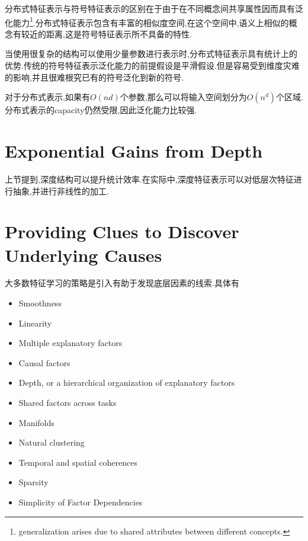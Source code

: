 分布式特征表示与符号特征表示的区别在于由于在不同概念间共享属性因而具有泛化能力\footnote{generalization arises due to shared attributes between different concepts.}.分布式特征表示包含有丰富的相似度空间,在这个空间中,语义上相似的概念有较近的距离,这是符号特征表示所不具备的特性.

当使用很复杂的结构可以使用少量参数进行表示时,分布式特征表示具有统计上的优势.传统的符号特征表示泛化能力的前提假设是平滑假设.但是容易受到维度灾难的影响,并且很难根究已有的符号泛化到新的符号.

对于分布式表示,如果有$O(nd)$个参数,那么可以将输入空间划分为$O(n^d)$个区域.分布式表示的capacity仍然受限,因此泛化能力比较强.

\section{Exponential Gains from Depth}

上节提到,深度结构可以提升统计效率.在实际中,深度特征表示可以对低层次特征进行抽象,并进行非线性的加工.

\section{Providing Clues to Discover Underlying Causes}

大多数特征学习的策略是引入有助于发现底层因素的线索.具体有
\begin{itemize}
    \item Smoothness
    \item Linearity
    \item Multiple explanatory factors
    \item Causal factors
    \item Depth, or a hierarchical organization of explanatory factors
    \item Shared factors across tasks
    \item Manifolds
    \item Natural clustering
    \item Temporal and spatial coherences
    \item Sparsity
    \item Simplicity of Factor Dependencies
\end{itemize}
